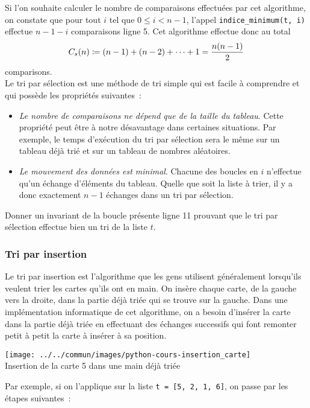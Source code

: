 \documentclass{magnolia}
\begin{document}
Si l'on souhaite calculer le nombre de comparaisons effectuées par cet algorithme, on constate que
pour tout $i$ tel que $0\leq i < n-1$, l'appel \verb!indice_minimum(t, i)! effectue $n-1-i$ comparaisons ligne 5. Cet algorithme effectue donc au total
\[C_s(n)\coloneqq (n-1)+(n-2)+\cdots+1 = \frac{n(n-1)}{2}\]
comparisons.\\

Le tri par sélection est une méthode de tri simple qui est facile à comprendre et
qui possède les propriétés suivantes~:
\begin{itemize}
\item \emph{Le nombre de comparaisons ne dépend que de la taille du tableau}. Cette
  propriété peut être à notre désavantage dans certaines situations. Par exemple,
  le temps d'exécution du tri par sélection sera le même sur un tableau déjà trié et
  sur un tableau de nombres aléatoires.
\item \emph{Le mouvement des données est minimal}. Chacune des boucles en $i$
  n'effectue qu'un échange d'éléments du tableau. Quelle que soit la liste à trier, il y a donc
  exactement $n-1$ échanges dans un tri par sélection.
\end{itemize}

\begin{exoUnique}
\exo Donner un invariant de la boucle présente ligne 11 prouvant que le tri par sélection
  effectue bien un tri de la liste $t$.
\end{exoUnique}

\subsubsection{Tri par insertion}

Le tri par insertion est l'algorithme que les gens utilisent généralement lorsqu'ils
veulent trier les cartes qu'ils ont en main. On insère chaque carte, de la gauche
vers la droite, dans la partie déjà triée qui se trouve sur la gauche.
Dans une implémentation informatique de cet algorithme, on a besoin d'insérer la carte
dans la partie déjà triée en effectuant des échanges successifs qui font remonter
petit à petit la carte à insérer à sa position.

\begin{center}
\texttt{[image: ../../commun/images/python-cours-insertion\_carte]}\\
Insertion de la carte 5 dans une main déjà triée
\end{center}
\noindent Par exemple,
si on l'applique sur la liste \verb!t = [5, 2, 1, 6]!, on passe par les étapes
suivantes~: 
\end{document}
